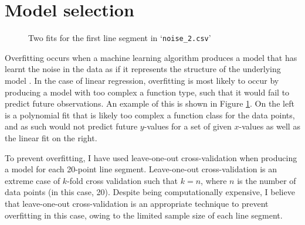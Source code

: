 \documentclass[onecolumn, 12pt, a4paper]{article}
\begin{document}
\section{Model selection}

\begin{figure}[htbp]
    \centering
    \hfill
    \caption{Two fits for the first line segment in `\texttt{noise\_2.csv}'}
    \label{fig:noise_2.csv}
\end{figure}

Overfitting occurs when a machine learning algorithm
produces a model that has learnt the noise in the data
as if it represents the structure of the underlying
model \cite{MSMI}.
In the case of linear regression, overfitting is most
likely to occur by producing a model with too complex a function
type, such that it would fail to predict future observations.
An example of this is shown in Figure \ref{fig:noise_2.csv}.
On the left is a polynomial fit that is likely too complex
a function class for the data points, and as such would not
predict future $y$-values for a set of given $x$-values
as well as the linear fit on the right.

To prevent overfitting, I have used leave-one-out
cross-validation when producing a model for each 20-point
line segment. Leave-one-out cross-validation is 
an extreme case of $k$-fold cross validation
such that $k = n$, where
$n$ is the number of data points (in this case, 20).
Despite being computationally expensive, I believe that
leave-one-out cross-validation is an appropriate technique
to prevent overfitting in this case,
owing to the limited sample size of each line segment.
\end{document}

